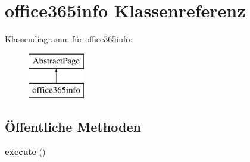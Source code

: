 \hypertarget{classoffice365info}{}\section{office365info Klassenreferenz}
\label{classoffice365info}
Klassendiagramm für office365info\+:\begin{figure}[H]
\begin{center}
\leavevmode
\includegraphics[height=2.000000cm]{classoffice365info}
\end{center}
\end{figure}
\subsection*{Öffentliche Methoden}
\begin{DoxyCompactItemize}
\item 
\mbox{\label{classoffice365info_ab9e5b0f8528404ed0da8b897aa6b08c8}} 
{\bfseries execute} ()
\end{DoxyCompactItemize}
